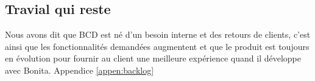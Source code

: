 \subsection{Travial qui reste}
Nous avons dit que BCD est né d'un besoin interne et des retours de clients, c'est ainsi que les fonctionnalités demandées augmentent et que le produit est toujours en évolution pour fournir au client une meilleure expérience quand il développe avec Bonita. Appendice \ref{appen:backlog}
